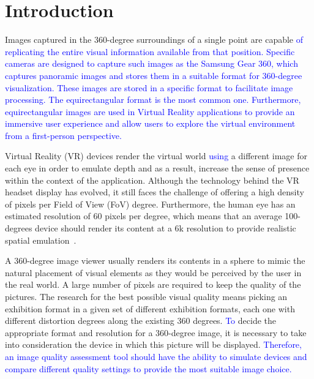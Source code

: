 \documentclass[10pt,conference]{IEEEtran}
\begin{document}

\IEEEpeerreviewmaketitle

\section{Introduction} \label{sec:introduction}
Images captured in the 360-degree surroundings of a single point are capable \textcolor{blue}{of replicating the entire visual information available from that position. Specific cameras are designed to capture such images as the Samsung Gear 360\degree, which captures panoramic images and stores them in a suitable format for 360-degree visualization. These images are stored in a specific format to facilitate image processing. The equirectangular format is the most common one. Furthermore, equirectangular images are used in Virtual Reality applications to provide an immersive user experience and allow users to explore the virtual environment from a first-person perspective.} \par

Virtual Reality (VR) devices render the virtual world \textcolor{blue}{using} a different image for each eye in order to emulate depth and as a result, increase the sense of presence within the context of the application. Although the technology behind the VR headset display has evolved, it still faces the challenge of offering a high density of pixels per Field of View (FoV) degree. Furthermore, the human eye has an estimated resolution of 60 pixels per degree, which means that an average 100-degrees device should render its content at a 6k resolution to provide realistic spatial emulation~\cite{va1965visual}. \par

A 360-degree image viewer usually renders its contents in a sphere to mimic the natural placement of visual elements as they would be perceived by the user in the real world. A large number of pixels are required to keep the quality of the pictures. The research for the best possible visual quality means picking an exhibition format in a given set of different exhibition formats, each one with different distortion degrees along the existing 360 degrees. \textcolor{blue}{To} decide the appropriate format and resolution for a 360-degree image, it is necessary to take into consideration the device in which this picture will be displayed.
\textcolor{blue}{Therefore, an image quality assessment tool should have the ability to simulate devices and compare different quality settings to provide the most suitable image choice.}\par
\end{document}
